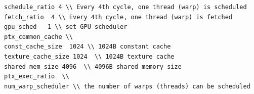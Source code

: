 \begin{Verbatim}
schedule_ratio 4 \\ Every 4th cycle, one thread (warp) is scheduled 
fetch_ratio  4 \\ Every 4th cycle, one thread (warp) is fetched 
gpu_sched   1 \\ set GPU scheduler 
ptx_common_cache \\ 
const_cache_size  1024 \\ 1024B constant cache  
texture_cache_size 1024  \\ 1024B texture cache
shared_mem_size 4096  \\ 4096B shared memory size 
ptx_exec_ratio  \\ 
num_warp_scheduler \\ the number of warps (threads) can be scheduled  
\end{Verbatim}











